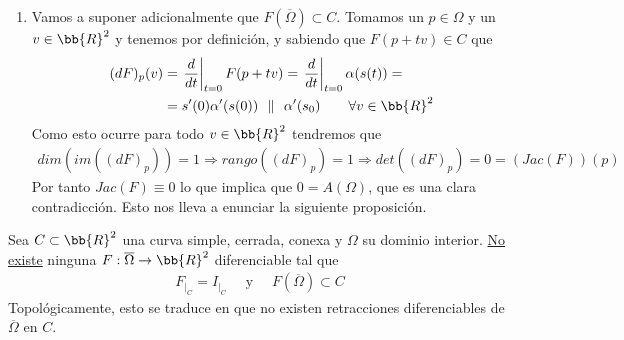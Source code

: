 \begin{observacion}
\begin{enumerate}[start=4]
\begin{enumerate}
            \item Vamos a suponer adicionalmente que $F(\overline{\Omega})\subset C$. Tomamos un $p\in \Omega$ y un $v\in \bb{R}^2$ y tenemos por definición, y sabiendo que $F(p+tv)\in C$ que
            \begin{align*}
                (dF)_p(v) &= 
                \left.\frac{d}{dt}\right|_{t=0} F(p+tv) =
                \left.\frac{d}{dt}\right|_{t=0} \alpha(s(t)) =\\
                &= 
                s'(0) \alpha'(s(0))\ \ \| \ \ \alpha'(s_0) \qquad \forall v \in \bb{R}^2
            \end{align*}
            Como esto ocurre para todo $v\in \bb{R}^2$ tendremos que 
            \begin{gather*}
                dim(im((dF)_p)) = 1  \Rightarrow rango((dF)_p) = 1 \Rightarrow det((dF)_p) = 0 = (Jac(F))(p)
            \end{gather*}
            Por tanto $Jac(F) \equiv 0$ lo que implica que $0=A(\Omega)$, que es una clara contradicción. Esto nos lleva a enunciar la siguiente proposición.
        \end{enumerate}
    \end{enumerate}
\end{observacion}

\begin{prop}
    Sea $C\subset \bb{R}^2$ una curva simple, cerrada, conexa y $\Omega$ su dominio interior. \underline{No existe} ninguna $F:\overline{\Omega} \to \bb{R}^2$ diferenciable tal que 
    \begin{gather*}
        F_{|_C} = I_{|_C} \quad \text{ y } \quad F(\overline{\Omega})\subset C
    \end{gather*}
    Topológicamente, esto se traduce en que no existen retracciones diferenciables de $\overline{\Omega}$ en $C$.
\end{prop}

